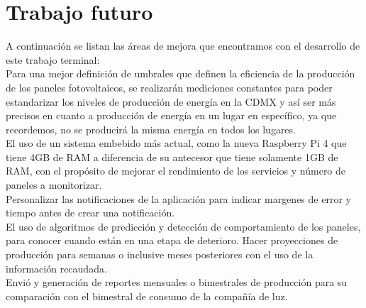 \chapter{Trabajo futuro}\label{chapter7}

\newline A continuación se listan las áreas de mejora que encontramos con el desarrollo de este trabajo terminal:
\\
\newline Para una mejor definición de umbrales que definen la eficiencia de la producción de los paneles fotovoltaicos, se realizarán mediciones constantes para poder estandarizar los niveles de producción de energía en la CDMX y así ser más precisos en cuanto a producción de energía en un lugar en específico, ya que recordemos, no se producirá la misma energía en todos los lugares. 
\\
\newline El uso de un sistema embebido más actual, como la nueva Raspberry Pi 4 que tiene 4GB de RAM a diferencia de su antecesor que tiene solamente 1GB de RAM, con el propósito de mejorar el rendimiento de los servicios y número de paneles a monitorizar.
\\
\newline Personalizar las notificaciones de la aplicación para indicar margenes de error y tiempo antes de crear una notificación.
\\
\newline El uso de algoritmos de predicción y detección de comportamiento de los paneles, para conocer cuando están en una etapa de deterioro. Hacer proyecciones de producción para semanas o inclusive meses posteriores con el uso de la información recaudada.
\\
\newline Envió y generación de reportes mensuales o bimestrales de producción para su comparación con el bimestral de consumo de la compañía de luz. 
